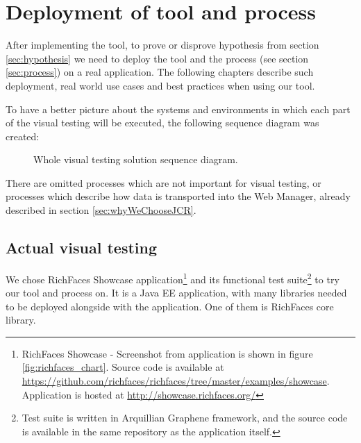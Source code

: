 \documentclass[11pt,oneside,final]{fithesis2}
\begin{document}
\chapter{Deployment of tool and process}
After implementing the tool, to prove or disprove hypothesis from section \ref{sec:hypothesis} we need to deploy the tool and the
process (see section \ref{sec:process}) on a real application. The following chapters describe such deployment, real world use cases
and best practices when using our tool.

To have a better picture about the systems and environments in which each part of the visual testing will be executed, the following
sequence diagram was created:

\begin{figure}[!htb]
      \begin{center}
      \leavevmode
      \centerline{}
      \end{center}
      \caption{Whole visual testing solution sequence diagram.}
      \label{fig:wholeSolutionSequenceDiagram}
\end{figure}

There are omitted processes which are not important for visual testing, or processes which describe how data is transported into
the Web Manager, already described in section \ref{sec:whyWeChooseJCR}.
  
  \section{Actual visual testing}
  We chose RichFaces Showcase 
  application\footnote{RichFaces Showcase - Screenshot from application is shown in figure \ref{fig:richfaces_chart}. 
  Source code is available at \url{https://github.com/richfaces/richfaces/tree/master/examples/showcase}. 
  Application is hosted at \url{http://showcase.richfaces.org/}} 
  and its functional test suite\footnote{Test suite is written in Arquillian Graphene framework, and the source code is 
  available in the same repository as the application itself.} to try our tool and process on. It is a Java EE application, with
  many libraries needed to be deployed alongside with the application. One of them is RichFaces core library.
  
\end{document}
